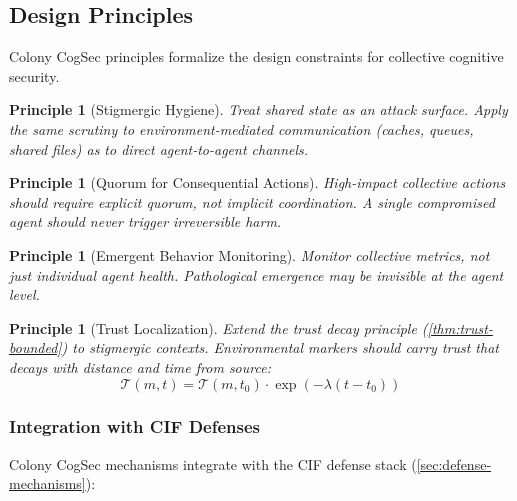 \documentclass[
]{article}
\newtheorem{principle}[theorem]{Principle}
\begin{document}
\subsection{Design Principles}\label{sec:design-principles}

Colony CogSec principles formalize the design constraints for collective
cognitive security.

\begin{principle}[Stigmergic Hygiene]
\label{principle:stigmergic-hygiene}
Treat shared state as an attack surface. Apply the same scrutiny to environment-mediated communication (caches, queues, shared files) as to direct agent-to-agent channels.
\end{principle}

\begin{principle}[Quorum for Consequential Actions]
\label{principle:quorum}
High-impact collective actions should require explicit quorum, not implicit coordination. A single compromised agent should never trigger irreversible harm.
\end{principle}

\begin{principle}[Emergent Behavior Monitoring]
\label{principle:emergent-monitoring}
Monitor collective metrics, not just individual agent health. Pathological emergence may be invisible at the agent level.
\end{principle}

\begin{principle}[Trust Localization]
\label{principle:trust-localization}
Extend the trust decay principle (\cref{thm:trust-bounded}) to stigmergic contexts. Environmental markers should carry trust that decays with distance and time from source:
\begin{equation}
\mathcal{T}(m, t) = \mathcal{T}(m, t_0) \cdot \exp(-\lambda(t - t_0))
\label{eq:stigmergic-trust-decay}
\end{equation}
\end{principle}

\subsubsection{Integration with CIF Defenses}\label{sec:cif-integration}

Colony CogSec mechanisms integrate with the CIF defense stack
(\cref{sec:defense-mechanisms}):
\end{document}
